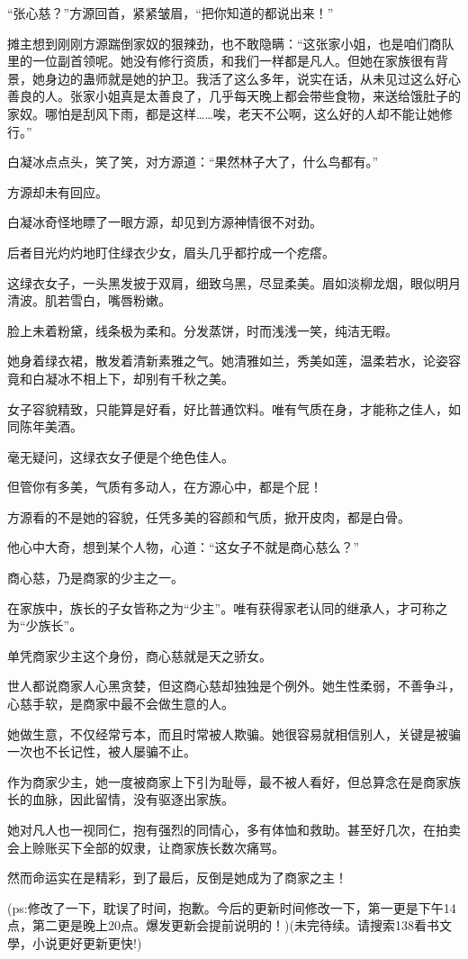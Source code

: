 \begin{this_body}
“张心慈？”方源回首，紧紧皱眉，“把你知道的都说出来！”

摊主想到刚刚方源踹倒家奴的狠辣劲，也不敢隐瞒：“这张家小姐，也是咱们商队里的一位副首领呢。她没有修行资质，和我们一样都是凡人。但她在家族很有背景，她身边的蛊师就是她的护卫。我活了这么多年，说实在话，从未见过这么好心善良的人。张家小姐真是太善良了，几乎每天晚上都会带些食物，来送给饿肚子的家奴。哪怕是刮风下雨，都是这样……唉，老天不公啊，这么好的人却不能让她修行。”

白凝冰点点头，笑了笑，对方源道：“果然林子大了，什么鸟都有。”

方源却未有回应。

白凝冰奇怪地瞟了一眼方源，却见到方源神情很不对劲。

后者目光灼灼地盯住绿衣少女，眉头几乎都拧成一个疙瘩。

这绿衣女子，一头黑发披于双肩，细致乌黑，尽显柔美。眉如淡柳龙烟，眼似明月清波。肌若雪白，嘴唇粉嫩。

脸上未着粉黛，线条极为柔和。分发蒸饼，时而浅浅一笑，纯洁无暇。

她身着绿衣裙，散发着清新素雅之气。她清雅如兰，秀美如莲，温柔若水，论姿容竟和白凝冰不相上下，却别有千秋之美。

女子容貌精致，只能算是好看，好比普通饮料。唯有气质在身，才能称之佳人，如同陈年美酒。

毫无疑问，这绿衣女子便是个绝色佳人。

但管你有多美，气质有多动人，在方源心中，都是个屁！

方源看的不是她的容貌，任凭多美的容颜和气质，掀开皮肉，都是白骨。

他心中大奇，想到某个人物，心道：“这女子不就是商心慈么？”

商心慈，乃是商家的少主之一。

在家族中，族长的子女皆称之为“少主”。唯有获得家老认同的继承人，才可称之为“少族长”。

单凭商家少主这个身份，商心慈就是天之骄女。

世人都说商家人心黑贪婪，但这商心慈却独独是个例外。她生性柔弱，不善争斗，心慈手软，是商家中最不会做生意的人。

她做生意，不仅经常亏本，而且时常被人欺骗。她很容易就相信别人，关键是被骗一次也不长记性，被人屡骗不止。

作为商家少主，她一度被商家上下引为耻辱，最不被人看好，但总算念在是商家族长的血脉，因此留情，没有驱逐出家族。

她对凡人也一视同仁，抱有强烈的同情心，多有体恤和救助。甚至好几次，在拍卖会上赊账买下全部的奴隶，让商家族长数次痛骂。

然而命运实在是精彩，到了最后，反倒是她成为了商家之主！

(ps:修改了一下，耽误了时间，抱歉。今后的更新时间修改一下，第一更是下午14点，第二更是晚上20点。爆发更新会提前说明的！)(未完待续。请搜索138看书文學，小说更好更新更快!)

\end{this_body}

